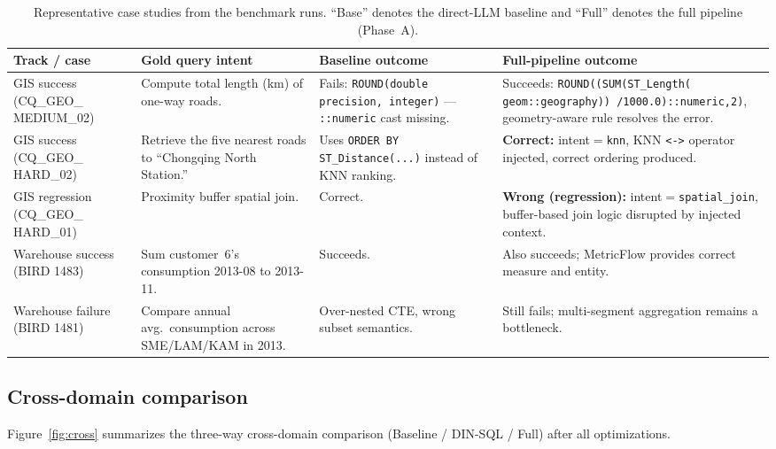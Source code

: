 \documentclass[11pt]{article}
\begin{document}
\begin{table}[p]
\centering
\scriptsize
\caption{Representative case studies from the benchmark runs. ``Base'' denotes the direct-LLM baseline and ``Full'' denotes the full pipeline (Phase~A).}
\label{tab:case}
\begin{tabular}{p{1.8cm} p{2.8cm} p{4.2cm} p{4.2cm}}
\toprule
Track / case & Gold query intent & Baseline outcome & Full-pipeline outcome \\
\midrule
GIS success (CQ\_GEO\_ MEDIUM\_02) & Compute total length (km) of one-way roads. & Fails: \texttt{ROUND(double precision, integer)} — \texttt{::numeric} cast missing. & Succeeds: \texttt{ROUND((SUM(ST\_Length( geom::geography)) /1000.0)::numeric,2)}, geometry-aware rule resolves the error. \\
\midrule
GIS success (CQ\_GEO\_ HARD\_02) & Retrieve the five nearest roads to ``Chongqing North Station.'' & Uses \texttt{ORDER BY ST\_Distance(...)} instead of KNN ranking. & \textbf{Correct:} intent$=$\texttt{knn}, KNN \texttt{<->} operator injected, correct ordering produced. \\
\midrule
GIS regression (CQ\_GEO\_ HARD\_01) & Proximity buffer spatial join. & Correct. & \textbf{Wrong (regression):} intent$=$\texttt{spatial\_join}, buffer-based join logic disrupted by injected context. \\
\midrule
Warehouse success (BIRD 1483) & Sum customer~6's consumption 2013-08 to 2013-11. & Succeeds. & Also succeeds; MetricFlow provides correct measure and entity. \\
\midrule
Warehouse failure (BIRD 1481) & Compare annual avg.\ consumption across SME/LAM/KAM in 2013. & Over-nested CTE, wrong subset semantics. & Still fails; multi-segment aggregation remains a bottleneck. \\
\bottomrule
\end{tabular}
\end{table}

\subsection{Cross-domain comparison}

Figure~\ref{fig:cross} summarizes the three-way cross-domain comparison (Baseline / DIN-SQL / Full) after all optimizations.
\end{document}
